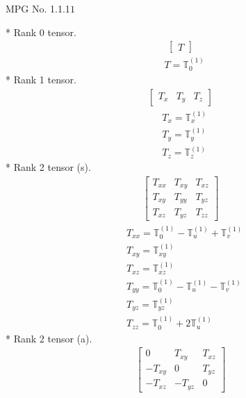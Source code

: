 \documentclass[fleqn,8pt,landscape]{jsarticle}
\begin{document}
\setcounter{MaxMatrixCols}{32}

\renewcommand{\tablename}{Table~}
\renewcommand{\figurename}{Figure~}
\begin{center}
\LARGE
MPG No. 1.1.1\quad$1$
\end{center}
* Rank 0 tensor.
\begin{align*}
\begin{bmatrix} T \end{bmatrix}
\end{align*}
\begin{align*}
& T = \mathbb{T}_{0}^{(1)}
\end{align*}
* Rank 1 tensor.
\begin{align*}
\begin{bmatrix} T_{x} & T_{y} & T_{z} \end{bmatrix}
\end{align*}
\begin{align*}
& T_{x} = \mathbb{T}_{x}^{(1)} \\
& T_{y} = \mathbb{T}_{y}^{(1)} \\
& T_{z} = \mathbb{T}_{z}^{(1)}
\end{align*}
* Rank 2 tensor (s).
\begin{align*}
\begin{bmatrix} T_{xx} & T_{xy} & T_{xz} \\ T_{xy} & T_{yy} & T_{yz} \\ T_{xz} & T_{yz} & T_{zz} \end{bmatrix}
\end{align*}
\begin{align*}
& T_{xx} = \mathbb{T}_{0}^{(1)} - \mathbb{T}_{u}^{(1)} + \mathbb{T}_{v}^{(1)} \\
& T_{xy} = \mathbb{T}_{xy}^{(1)} \\
& T_{xz} = \mathbb{T}_{xz}^{(1)} \\
& T_{yy} = \mathbb{T}_{0}^{(1)} - \mathbb{T}_{u}^{(1)} - \mathbb{T}_{v}^{(1)} \\
& T_{yz} = \mathbb{T}_{yz}^{(1)} \\
& T_{zz} = \mathbb{T}_{0}^{(1)} + 2 \mathbb{T}_{u}^{(1)}
\end{align*}
* Rank 2 tensor (a).
\begin{align*}
\begin{bmatrix} 0 & T_{xy} & T_{xz} \\ - T_{xy} & 0 & T_{yz} \\ - T_{xz} & - T_{yz} & 0 \end{bmatrix}
\end{align*}
\end{document}
